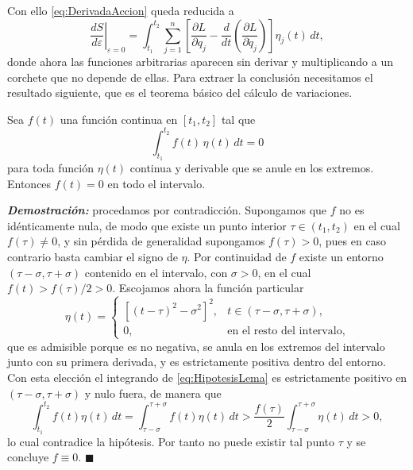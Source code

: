         Con ello \eqref{eq:DerivadaAccion} queda reducida a
        \begin{equation}\label{eq:VariacionFinal}
            \left.\frac{dS}{d\varepsilon}\right|_{\varepsilon=0} = \int_{t_{1}}^{t_{2}}\sum_{j=1}^{n}\left[\frac{\partial L}{\partial q_{j}} - \frac{d}{dt}\left(\frac{\partial L}{\partial\dot{q}_{j}}\right)\right]\eta_{j}(t)\,dt,
        \end{equation}
        donde ahora las funciones arbitrarias aparecen sin derivar y multiplicando a un corchete que no depende de ellas. Para extraer la conclusión necesitamos el resultado siguiente, que es el teorema básico del cálculo de variaciones.

        \begin{myteo}\label{teo:LemaFundamental}
            Sea $f(t)$ una función continua en $[t_{1},t_{2}]$ tal que
            \begin{equation}\label{eq:HipotesisLema}
                \int_{t_{1}}^{t_{2}} f(t)\,\eta(t)\,dt = 0
            \end{equation}
            para toda función $\eta(t)$ continua y derivable que se anule en los extremos. Entonces $f(t) = 0$ en todo el intervalo.
        \end{myteo}

        \textbf{\textit{Demostración:}} procedamos por contradicción. Supongamos que $f$ no es idénticamente nula, de modo que existe un punto interior $\tau\in(t_{1},t_{2})$ en el cual $f(\tau)\neq 0$, y sin pérdida de generalidad supongamos $f(\tau) > 0$, pues en caso contrario basta cambiar el signo de $\eta$. Por continuidad de $f$ existe un entorno $(\tau-\sigma,\tau+\sigma)$ contenido en el intervalo, con $\sigma>0$, en el cual $f(t) > f(\tau)/2 > 0$. Escojamos ahora la función particular
        \begin{equation}\label{eq:EtaEscogida}
            \eta(t) = \begin{cases}
                \left[(t-\tau)^{2}-\sigma^{2}\right]^{2}, & t\in(\tau-\sigma,\tau+\sigma),\\[4pt]
                0, & \text{en el resto del intervalo},
            \end{cases}
        \end{equation}
        que es admisible porque es no negativa, se anula en los extremos del intervalo junto con su primera derivada, y es estrictamente positiva dentro del entorno. Con esta elección el integrando de \eqref{eq:HipotesisLema} es estrictamente positivo en $(\tau-\sigma,\tau+\sigma)$ y nulo fuera, de manera que
        \begin{equation}\label{eq:ContradiccionLema}
            \int_{t_{1}}^{t_{2}} f(t)\eta(t)\,dt = \int_{\tau-\sigma}^{\tau+\sigma} f(t)\eta(t)\,dt > \frac{f(\tau)}{2}\int_{\tau-\sigma}^{\tau+\sigma}\eta(t)\,dt > 0,
        \end{equation}
        lo cual contradice la hipótesis. Por tanto no puede existir tal punto $\tau$ y se concluye $f\equiv 0$. $\blacksquare$

